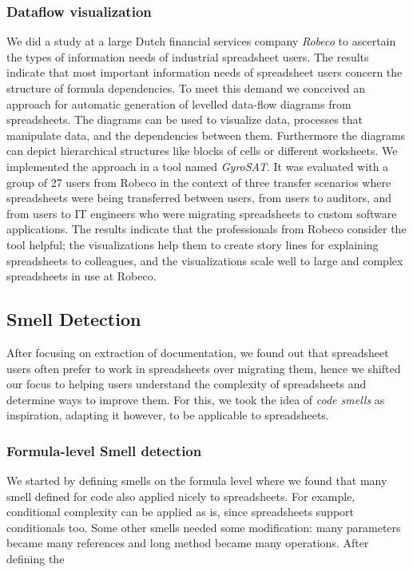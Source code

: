 \documentclass[conference]{IEEEtran}
\begin{document}
\subsubsection{Dataflow visualization}
We did a study at a large Dutch financial services company \textit{Robeco} to ascertain the types of information needs of industrial spreadsheet users\cite{Hermans2011}. The results indicate that most important information needs of spreadsheet users concern the structure of formula dependencies. To meet this demand we conceived an approach for automatic generation of levelled data-flow diagrams from spreadsheets. The diagrams can be used to visualize data, processes that manipulate data, and the dependencies between them. Furthermore the diagrams can depict hierarchical structures like blocks of cells or different worksheets. We implemented the approach in a tool named \textit{GyroSAT}. It was evaluated with a group of 27 users from Robeco in the context of three transfer scenarios where spreadsheets were being transferred between users, from users to auditors, and from users to IT engineers who were migrating spreadsheets to custom software applications. The results indicate that the professionals from Robeco consider the tool helpful; the visualizations help them to create story lines for explaining spreadsheets to colleagues, and the visualizations scale well to large and complex spreadsheets in use at Robeco.

\subsection{Smell Detection} 
After focusing on extraction of documentation, we found out that spreadsheet users often prefer to work in spreadsheets over migrating them, hence we shifted our focus to helping users understand the complexity of spreadsheets and determine ways to improve them. For this, we took the idea of \emph{code smells} as inspiration, adapting it however, to be applicable to spreadsheets.

\subsubsection{Formula-level Smell detection}
We started by defining smells on the formula level where we found that many smell defined for code also applied nicely to spreadsheets. For example, conditional complexity can be applied as is, since spreadsheets support conditionals too. Some other smells needed some modification: many parameters became many references and long method became many operations. After defining the 
\end{document}
